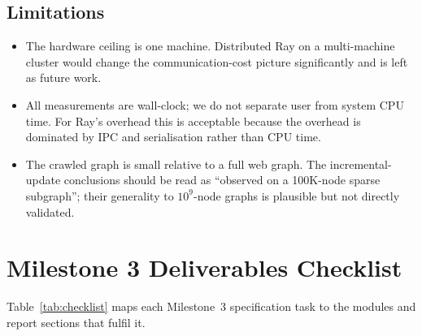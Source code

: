 \documentclass[11pt,a4paper]{article}
\begin{document}
\subsection{Limitations}
\begin{itemize}
    \item The hardware ceiling is one machine. Distributed Ray on a
    multi-machine cluster would change the communication-cost picture
    significantly and is left as future work.
    \item All measurements are wall-clock; we do not separate user from
    system CPU time. For Ray's overhead this is acceptable because the
    overhead is dominated by IPC and serialisation rather than CPU
    time.
    \item The crawled graph is small relative to a full web graph. The
    incremental-update conclusions should be read as
    ``observed on a 100K-node sparse subgraph''; their generality to
    $10^9$-node graphs is plausible but not directly validated.
\end{itemize}

\section{Milestone 3 Deliverables Checklist}
Table~\ref{tab:checklist} maps each Milestone~3 specification task to
the modules and report sections that fulfil it.
\end{document}
